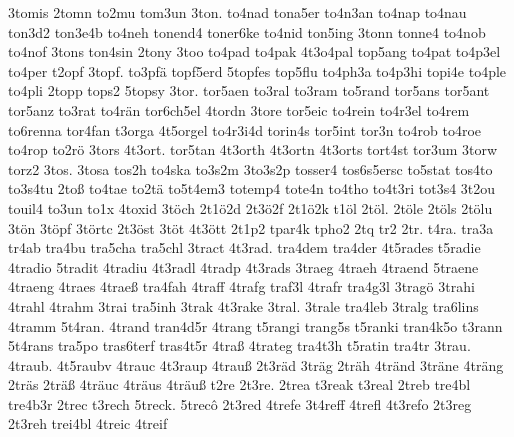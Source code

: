 {    3tomis
    2tomn
    to2mu
    tom3un
    3ton.
    to4nad
    tona5er
    to4n3an
    to4nap
    to4nau
    ton3d2
    ton3e4b
    to4neh
    tonend4
    toner6ke
    to4nid
    ton5ing
    3tonn
    tonne4
    to4nob
    to4nof
    3tons
    ton4sin
    2tony
    3too
    to4pad
    to4pak
    4t3o4pal
    top5ang
    to4pat
    to4p3el
    to4per
    t2opf
    3topf.
    to3pfä
    topf5erd
    5topfes
    top5flu
    to4ph3a
    to4p3hi
    topi4e
    to4ple
    to4pli
    2topp
    tops2
    5topsy
    3tor.
    tor5aen
    to3ral
    to3ram
    to5rand
    tor5ans
    tor5ant
    tor5anz
    to3rat
    to4rän
    tor6ch5el
    4tordn
    3tore
    tor5eic
    to4rein
    to4r3el
    to4rem
    to6renna
    tor4fan
    t3orga
    4t5orgel
    to4r3i4d
    torin4s
    tor5int
    tor3n
    to4rob
    to4roe
    to4rop
    to2rö
    3tors
    4t3ort.
    tor5tan
    4t3orth
    4t3ortn
    4t3orts
    tort4st
    tor3um
    3torw
    torz2
    3tos.
    3tosa
    tos2h
    to4ska
    to3s2m
    3to3s2p
    tosser4
    tos6s5ersc
    to5stat
    tos4to
    to3s4tu
    2toß
    to4tae
    to2tä
    to5t4em3
    totemp4
    tote4n
    to4tho
    to4t3ri
    tot3s4
    3t2ou
    touil4
    to3un
    to1x
    4toxid
    3töch
    2t1ö2d
    2t3ö2f
    2t1ö2k
    t1öl
    2töl.
    2töle
    2töls
    2tölu
    3tön
    3töpf
    3törtc
    2t3öst
    3töt
    4t3ött
    2t1p2
    tpar4k
    tpho2
    2tq
    tr2
    2tr.
    t4ra.
    tra3a
    tr4ab
    tra4bu
    tra5cha
    tra5chl
    3tract
    4t3rad.
    tra4dem
    tra4der
    4t5rades
    t5radie
    4tradio
    5tradit
    4tradiu
    4t3radl
    4tradp
    4t3rads
    3traeg
    4traeh
    4traend
    5traene
    4traeng
    4traes
    4traeß
    tra4fah
    4traff
    4trafg
    traf3l
    4trafr
    tra4g3l
    3tragö
    3trahi
    4trahl
    4trahm
    3trai
    tra5inh
    3trak
    4t3rake
    3tral.
    3trale
    tra4leb
    3tralg
    tra6lins
    4tramm
    5t4ran.
    4trand
    tran4d5r
    4trang
    t5rangi
    trang5s
    t5ranki
    tran4k5o
    t3rann
    5t4rans
    tra5po
    tras6terf
    tras4t5r
    4traß
    4trateg
    tra4t3h
    t5ratin
    tra4tr
    3trau.
    4traub.
    4t5raubv
    4trauc
    4t3raup
    4trauß
    2t3räd
    3träg
    2träh
    4tränd
    3träne
    4träng
    2träs
    2träß
    4träuc
    4träus
    4träuß
    t2re
    2t3re.
    2trea
    t3reak
    t3real
    2treb
    tre4bl
    tre4b3r
    2trec
    t3rech
    5treck.
    5trecô
    2t3red
    4trefe
    3t4reff
    4trefl
    4t3refo
    2t3reg
    2t3reh
    trei4bl
    4treic
    4treif
}
